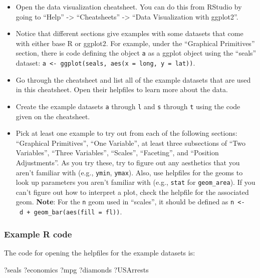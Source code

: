 \documentclass[]{book}
\makeatletter
\newenvironment{Shaded}{\begin{snugshade}}{\end{snugshade}}
\newcommand{\NormalTok}[1]{#1}
\providecommand{\tightlist}{%
  \setlength{\itemsep}{0pt}\setlength{\parskip}{0pt}}
\newenvironment{kframe}{%
\medskip{}
\setlength{\fboxsep}{.8em}
 \def\at@end@of@kframe{}%
 \ifinner\ifhmode%
  \def\at@end@of@kframe{\end{minipage}}%
  \begin{minipage}{\columnwidth}%
 \fi\fi%
 \def\FrameCommand##1{\hskip\@totalleftmargin \hskip-\fboxsep
 \colorbox{shadecolor}{##1}\hskip-\fboxsep
     \hskip-\linewidth \hskip-\@totalleftmargin \hskip\columnwidth}%
 \MakeFramed {\advance\hsize-\width
   \@totalleftmargin\z@ \linewidth\hsize
   \@setminipage}}%
 {\par\unskip\endMakeFramed%
 \at@end@of@kframe}
\renewenvironment{Shaded}{\begin{kframe}}{\end{kframe}}
\theoremstyle{definition}
\theoremstyle{definition}
\theoremstyle{definition}
\theoremstyle{remark}
\makeatother
\begin{document}
\begin{itemize}
\tightlist
\item
  Open the data visualization cheatsheet. You can do this from RStudio
  by going to ``Help'' -\textgreater{} ``Cheatsheets'' -\textgreater{}
  ``Data Visualization with ggplot2''.
\item
  Notice that different sections give examples with some datasets that
  come with either base R or ggplot2. For example, under the ``Graphical
  Primitives'' section, there is code defining the object \texttt{a} as
  a ggplot object using the ``seals'' dataset:
  \texttt{a\ \textless{}-\ ggplot(seals,\ aes(x\ =\ long,\ y\ =\ lat))}.
\item
  Go through the cheatsheet and list all of the example datasets that
  are used in this cheatsheet. Open their helpfiles to learn more about
  the data.
\item
  Create the example datasets \texttt{a} through \texttt{l} and
  \texttt{s} through \texttt{t} using the code given on the cheatsheet.
\item
  Pick at least one example to try out from each of the following
  sections: ``Graphical Primitives'', ``One Variable'', at least three
  subsections of ``Two Variables'', ``Three Variables'', ``Scales'',
  ``Faceting'', and ``Position Adjustments''. As you try these, try to
  figure out any aesthetics that you aren't familiar with (e.g.,
  \texttt{ymin}, \texttt{ymax}). Also, use helpfiles for the geoms to
  look up parameters you aren't familiar with (e.g., \texttt{stat} for
  \texttt{geom\_area}). If you can't figure out how to interpret a plot,
  check the helpfile for the associated geom. \textbf{Note}: For the
  \texttt{n} geom used in ``scales'', it should be defined as
  \texttt{n\ \textless{}-\ d\ +\ geom\_bar(aes(fill\ =\ fl))}.
\end{itemize}

\subsubsection{Example R code}\label{example-r-code-9}

The code for opening the helpfiles for the example datasets is:

\begin{Shaded}
\begin{Highlighting}[]
\NormalTok{?seals}
\NormalTok{?economics}
\NormalTok{?mpg}
\NormalTok{?diamonds}
\NormalTok{?USArrests}
\end{Highlighting}
\end{Shaded}
\end{document}
